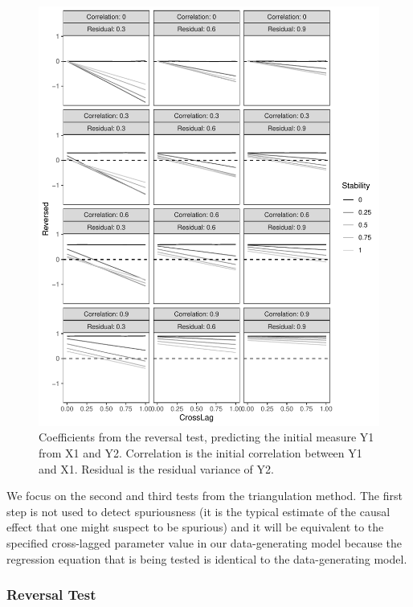 \documentclass[
  man,mask,floatsintext]{apa6}
\begin{document}
\begin{figure}
\centering
\includegraphics{triangulation_files/figure-latex/sim1-1.pdf}
\caption{\label{fig:sim1}Coefficients from the reversal test, predicting the initial measure Y1 from X1 and Y2. Correlation is the initial correlation between Y1 and X1. Residual is the residual variance of Y2.}
\end{figure}

We focus on the second and third tests from the triangulation method. The first step is not used to detect spuriousness (it is the typical estimate of the causal effect that one might suspect to be spurious) and it will be equivalent to the specified cross-lagged parameter value in our data-generating model because the regression equation that is being tested is identical to the data-generating model.

\subsubsection{Reversal Test}\label{reversal-test}
\end{document}

